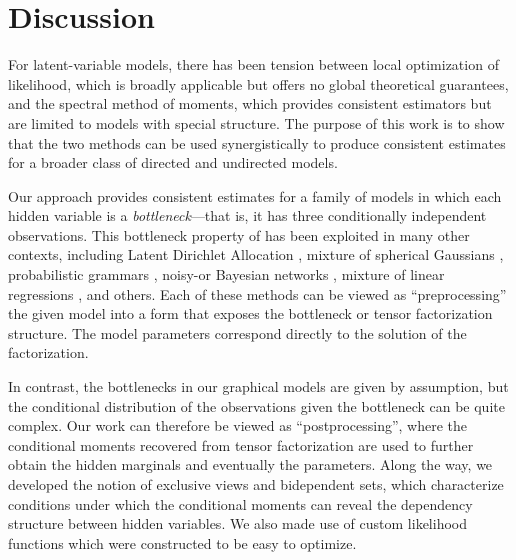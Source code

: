 \section{Discussion}
\label{sec:discussion}

For latent-variable models,
there has been tension between
local optimization of likelihood,
which is broadly applicable but offers no global theoretical guarantees,
and the spectral method of moments, which provides consistent estimators
but are limited to models with special structure.
The purpose of this work is to show that the two methods
can be used synergistically to produce consistent estimates
for a broader class of directed and undirected models.

Our approach provides consistent estimates for
a family of models in which each hidden variable is a \emph{bottleneck}---that is,
it has three conditionally independent observations.
This bottleneck property of \citet{anandkumar13tensor}
has been exploited in many other contexts,
including Latent Dirichlet Allocation \cite{anandkumar12lda},
mixture of spherical Gaussians \cite{hsu13spherical},
probabilistic grammars \cite{hsu12identifiability},
noisy-or Bayesian networks \cite{halpern2013unsupervised},
mixture of linear regressions \cite{chaganty13regression},
and others.
Each of these methods can be viewed as ``preprocessing'' the given model into a
form that exposes the bottleneck or tensor factorization structure.
The model parameters correspond directly to the solution of the factorization.

In contrast, the bottlenecks in our graphical models are given by assumption,
but the conditional distribution of the observations given the bottleneck
can be quite complex.
Our work can therefore be viewed as ``postprocessing'',
where the conditional moments recovered from tensor factorization
are used to further obtain the hidden marginals and eventually the parameters.
Along the way, we developed the notion of exclusive views and bidependent sets,
which characterize conditions under which the conditional moments can reveal
the dependency structure between hidden variables.
We also made use of custom likelihood functions which were constructed to be
easy to optimize.


